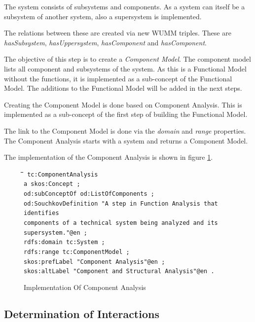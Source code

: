 \documentclass[11pt,a4paper]{article}
\newenvironment{code}{\tt \begin{tabbing}
\hskip12pt\=\hskip12pt\=\hskip12pt\=\hskip12pt\=\hskip5cm\=\hskip5cm\=\kill}
{\end{tabbing}}
\begin{document}
The system consists of subsystems and components.  As a system can itself be a
subsystem of another system, also a supersystem is implemented.

The relations between these are created via new WUMM triples.  These are
\emph{hasSubsystem}, \emph{hasUppersystem}, \emph{hasComponent} and
\emph{hasComponent}.

The objective of this step is to create a \emph{Component Model}.  The
component model lists all component and subsystems of the system.  As this is
a Functional Model without the functions, it is implemented as a sub-concept
of the Functional Model.  The additions to the Functional Model will be added
in the next steps.

Creating the Component Model is done based on Component Analysis.  This is
implemented as a sub-concept of the first step of building the Functional
Model.

The link to the Component Model is done via the \emph{domain} and \emph{range}
properties.  The Component Analysis starts with a system and returns a
Component Model.

The implementation of the Component Analysis is shown in figure
\ref{fig:implementation_component_analysis}.

\begin{figure}[ht]
  \centering
  \begin{code}\tt
    tc:ComponentAnalysis\\
    \> a skos:Concept ;\\
    \> od:subConceptOf od:ListOfComponents ;\\
    \> od:SouchkovDefinition "A step in Function Analysis that identifies\\
    \> \> components of a technical system being analyzed and its
    supersystem."@en ;\\ 
    \> rdfs:domain tc:System ;\\
    \> rdfs:range tc:ComponentModel ;\\
    \> skos:prefLabel "Component Analysis"@en ;\\
    \> skos:altLabel "Component and Structural Analysis"@en .
  \end{code}
  \caption{Implementation Of Component Analysis}
  \label{fig:implementation_component_analysis}
\end{figure}

\subsection{Determination of Interactions}
\end{document}

